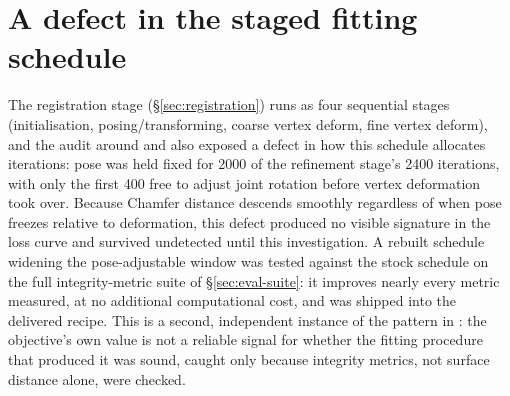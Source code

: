 \section{A defect in the staged fitting schedule}
\label{sec:staged}

The registration stage (\S\ref{sec:registration}) runs as four sequential
stages (initialisation, posing/transforming, coarse vertex deform, fine
vertex deform), and the audit around  and  also exposed
a defect in how this schedule allocates iterations: pose was held fixed for
2000 of the refinement stage's 2400 iterations, with only the first 400
free to adjust joint rotation before vertex deformation took over. Because
Chamfer distance descends smoothly regardless of when pose freezes relative
to deformation, this defect produced no visible signature in the loss curve
and survived undetected until this investigation. A rebuilt schedule
widening the pose-adjustable window was tested against the stock schedule on
the full integrity-metric suite of \S\ref{sec:eval-suite}: it improves
nearly every metric measured, at no additional computational cost, and was
shipped into the delivered recipe. This is a second, independent instance of
the pattern in : the objective's own value is not a reliable signal
for whether the fitting procedure that produced it was sound, caught only
because integrity metrics, not surface distance alone, were checked.
